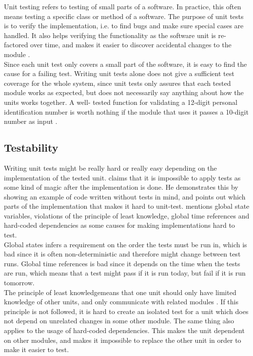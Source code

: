 \MakeShortVerb{\|}
Unit testing refers to testing of small parts of a software. In
practice, this often means testing a specific class or method of a
software. The purpose of unit tests is to verify the implementation,
i.e. to find bugs and make sure special cases are handled. It also helps
verifying the functionality as the software unit is re-factored over
time, and makes it easier to discover accidental changes to the module
\cite{web:xp_unittests, wiki:unittests}.\\

Since each unit test only covers a small part of the software, it is
easy to find the cause for a failing test. Writing unit tests alone does
not give a sufficient test coverage for the whole system, since unit
tests only assures that each tested module works as expected, but does
not necessarily say anything about how the units works together. A well-
tested function for validating a 12-digit personal identification number
is worth nothing if the module that uses it passes a 10-digit number as
input \cite{wiki:unittests}.\\


\subsection{Testability}

Writing unit tests might be really hard or really easy depending on the
implementation of the tested unit. \citet{video:misko_psychology} claims
that it is impossible to apply tests as some kind of magic after the
implementation is done. He demonstrates this by showing an example of
code written without tests in mind, and points out which parts of the
implementation that makes it hard to unit-test.
\citeauthor{video:misko_psychology} mentions global state variables,
violations of the principle of least knowledge, global time references
and hard-coded dependencies as some causes for making implementations
hard to test.\\

Global states infers a requirement on the order the tests
must be run in, which is bad since it is often non-deterministic and
therefore might change between test runs. Global time references is bad
since it depends on the time when the tests are run, which means that a
test might pass if it is run today, but fail if it is run tomorrow.\\

The principle of least knowledge\footnotemark means that one unit should
only have limited knowledge of other units, and only communicate with
related modules \cite{wiki:demeter}. If this principle is not followed,
it is hard to create an isolated test for a unit which does not depend
on unrelated changes in some other module. The same thing also applies
to the usage of hard-coded dependencies. This makes the unit dependent
on other modules, and makes it impossible to replace the other unit
in order to make it easier to test.\\

